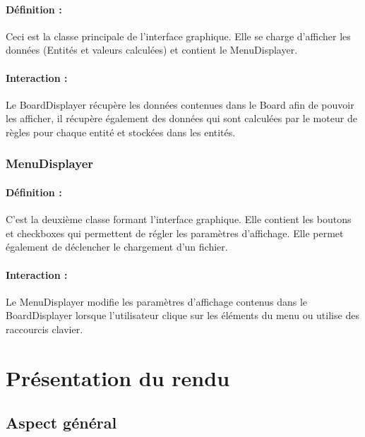 \documentclass[12pt]{article}
\begin{document}
				\paragraph{Définition :}
				Ceci est la classe principale de l'interface graphique. Elle se charge d'afficher les données (Entités et valeurs calculées)
				et contient le MenuDisplayer.
				\paragraph{Interaction :}
				Le BoardDisplayer récupère les données contenues dans le Board afin de pouvoir les afficher, il récupère également des données qui sont calculées
				par le moteur de règles pour chaque entité et stockées dans les entités.

			\subsubsection{MenuDisplayer}

				\paragraph{Définition :}
				C'est la deuxième classe formant l'interface graphique. Elle contient les boutons et checkboxes qui permettent
				de régler les paramètres d'affichage. Elle permet également de déclencher le chargement d'un fichier.
				\paragraph{Interaction :}
				Le MenuDisplayer modifie les paramètres d'affichage contenus dans le BoardDisplayer lorsque l'utilisateur clique
				sur les éléments du menu ou utilise des raccourcis clavier.


		\clearpage
		
	\section{Présentation du rendu}    

		\subsection{ Aspect général}
\end{document}
